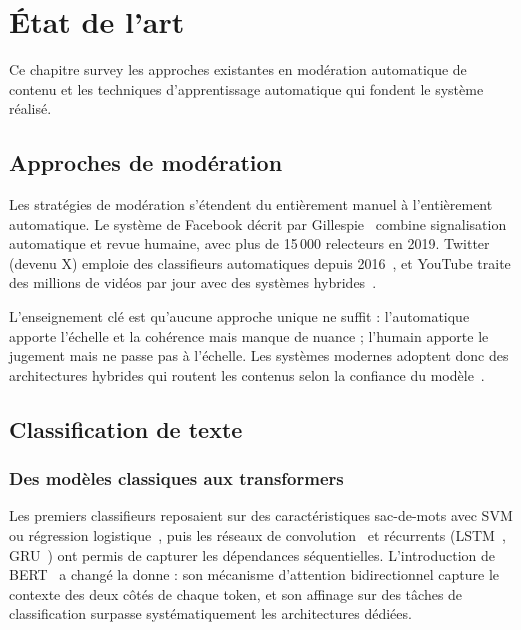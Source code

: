 \chapter{État de l'art}
\label{ch:state_of_art}

Ce chapitre survey les approches existantes en modération automatique de contenu et les techniques d'apprentissage automatique qui fondent le système réalisé.

\section{Approches de modération}

Les stratégies de modération s'étendent du entièrement manuel à l'entièrement automatique. Le système de Facebook décrit par Gillespie~\cite{gillespie2018curation} combine signalisation automatique et revue humaine, avec plus de 15\,000 relecteurs en 2019. Twitter (devenu X) emploie des classifieurs automatiques depuis 2016~\cite{chandrasekharan2017cross}, et YouTube traite des millions de vidéos par jour avec des systèmes hybrides~\cite{youtube2023moderation}.

L'enseignement clé est qu'aucune approche unique ne suffit : l'automatique apporte l'échelle et la cohérence mais manque de nuance ; l'humain apporte le jugement mais ne passe pas à l'échelle. Les systèmes modernes adoptent donc des architectures hybrides qui routent les contenus selon la confiance du modèle~\cite{elzayn2019fair}.

\section{Classification de texte}

\subsection{Des modèles classiques aux transformers}

Les premiers classifieurs reposaient sur des caractéristiques sac-de-mots avec SVM ou régression logistique~\cite{warner2012detecting}, puis les réseaux de convolution~\cite{kim2014cnn} et récurrents (LSTM~\cite{hochreiter1997long}, GRU~\cite{cho2014learning}) ont permis de capturer les dépendances séquentielles. L'introduction de BERT~\cite{devlin2019bert} a changé la donne : son mécanisme d'attention bidirectionnel capture le contexte des deux côtés de chaque token, et son affinage sur des tâches de classification surpasse systématiquement les architectures dédiées.

